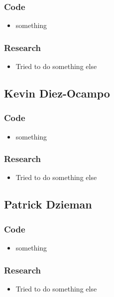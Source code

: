 \documentclass[10pt,a4paper]{article}
\begin{document}
\subsubsection*{Code}
\begin{itemize}
\item something

\end{itemize}
\subsubsection*{Research}
\begin{itemize}
\item Tried to do something else

\end{itemize}

\subsection*{Kevin Diez-Ocampo}

\subsubsection*{Code}
\begin{itemize}
\item something

\end{itemize}
\subsubsection*{Research}
\begin{itemize}
\item Tried to do something else

\end{itemize}

\subsection*{Patrick Dzieman}

\subsubsection*{Code}
\begin{itemize}
\item something

\end{itemize}
\subsubsection*{Research}
\begin{itemize}
\item Tried to do something else

\end{itemize}
\end{document}
